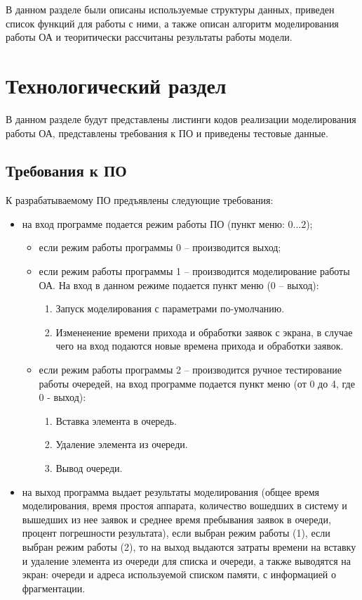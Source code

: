 В данном разделе были описаны используемые структуры данных, приведен список функций для работы с ними, а также описан алгоритм моделирования работы ОА и теоритически рассчитаны результаты работы модели.

\chapter{Технологический раздел}

В данном разделе будут представлены листинги кодов реализации моделирования работы ОА, представлены требования к ПО и приведены тестовые данные.

\section{Требования к ПО}

К разрабатываемому ПО предъявлены следующие требования:

\begin{itemize}[$\bullet$]
	\item на вход программе подается режим работы ПО (пункт меню: $0\dots2$);
	\begin{itemize}[---]
		\item если режим работы программы 0 -- производится выход;
		\item если режим работы программы 1 -- производится моделирование работы ОА. На вход в данном режиме подается пункт меню (0 -- выход):
		\begin{enumerate}
			\item Запуск моделирования с параметрами по-умолчанию.
			\item Измененение времени прихода и обработки заявок с экрана, в случае чего на вход подаются новые времена прихода и обработки заявок.
		\end{enumerate}
		\item если режим работы программы 2 -- производится ручное тестирование работы очередей, на вход программе подается пункт меню (от 0 до 4, где 0 - выход):
		\begin{enumerate}
			\item Вставка элемента в очередь.
			\item Удаление элемента из очереди.
			\item Вывод очереди.
		\end{enumerate}
	\end{itemize}
	\item на выход программа выдает результаты моделирования (общее время моделирования, время простоя аппарата, количество вошедших в систему и вышедших из нее заявок и среднее время пребывания заявок в очереди, процент погрешности результата), если выбран режим работы (1), если выбран режим работы (2), то на выход выдаются затраты времени на вставку и удаление элемента из очереди для списка и очереди, а также выводятся на экран: очереди и адреса используемой списком памяти, с информацией о фрагментации.
\end{itemize}

